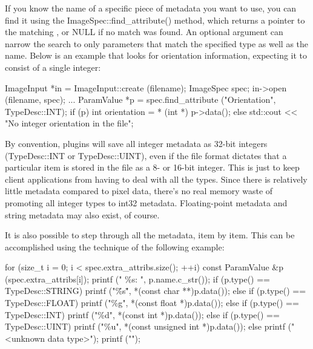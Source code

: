 If you know the name of a specific piece of metadata you want to use,
you can find it using the {\cf ImageSpec::find_attribute()}
method, which returns a pointer to the matching \ParamValue,
or {\cf NULL} if no match was found.  An optional \TypeDesc
argument can narrow the search to only parameters that match the
specified type as well as the name.  Below is an
example that looks for orientation information, expecting it to consist 
of a single integer:

\begin{code}
        ImageInput *in = ImageInput::create (filename);
        ImageSpec spec;
        in->open (filename, spec);
        ...
        ParamValue *p = spec.find_attribute ("Orientation", TypeDesc::INT);
        if (p) {
            int orientation = * (int *) p->data();
        } else {
            std::cout << "No integer orientation in the file\n";
        }
\end{code}

By convention, \ImageInput plugins will save all integer metadata as
32-bit integers ({\cf TypeDesc::INT} or {\cf TypeDesc::UINT}), even if the file format
dictates that a particular item is stored in the file as a 8- or 16-bit
integer.  This is just to keep client applications from having to deal
with all the types.  Since there is relatively little metadata compared
to pixel data, there's no real memory waste of promoting all integer
types to int32 metadata.  Floating-point metadata and string metadata
may also exist, of course.

It is also possible to step through all the metadata, item by item.
This can be accomplished using the technique of the following example:

\begin{code}
        for (size_t i = 0;  i < spec.extra_attribs.size();  ++i) {
            const ParamValue &p (spec.extra_attribs[i]);
            printf ("    \%s: ", p.name.c_str());
            if (p.type() == TypeDesc::STRING)
                printf ("\"\%s\"", *(const char **)p.data());
            else if (p.type() == TypeDesc::FLOAT)
                printf ("\%g", *(const float *)p.data());
            else if (p.type() == TypeDesc::INT)
                printf ("\%d", *(const int *)p.data());
            else if (p.type() == TypeDesc::UINT)
                printf ("\%u", *(const unsigned int *)p.data());
            else
                printf ("<unknown data type>");
            printf ("\n");
        }
\end{code}

